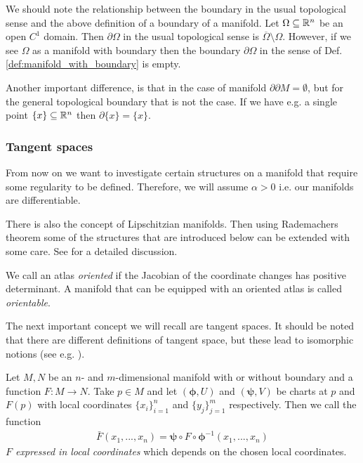 \documentclass[../main.tex]{subfiles}
\begin{document}
\begin{remark}
    We should note the relationship between the boundary in the usual topological sense 
    and the above definition of a boundary of a manifold. Let $\Omega \subseteq \mathbb{R}^n$ be 
    an open $C^1$ domain. Then $\partial \Omega$ in the usual topological sense 
    is $\overline{\Omega} \setminus \Omega$. However, if we see $\Omega$ 
    as a manifold with boundary then the boundary $\partial \Omega$ in the sense of 
    Def. \ref{def:manifold_with_boundary} is empty. 

    Another important difference, is that in the case of manifold $\partial \partial M = \emptyset$,
    but for the general topological boundary that is not the case. If we have e.g. a single 
    point $\{ x \} \subseteq \mathbb{R}^n$ then $\partial \{x \} = \{ x \}$.   
\end{remark}

\subsubsection{Tangent spaces}\label{sec:tangent_spaces}

From now on we want to investigate certain structures on a manifold 
that require some regularity to be defined. Therefore, 
we will assume $\alpha > 0$ i.e. our manifolds are 
differentiable.

\begin{remark}
    There is also the concept of Lipschitzian manifolds. Then using Rademachers 
    theorem some of the structures that are introduced below can be extended 
    with some care. See \cite{lipschitz_manifolds} for a detailed discussion.
\end{remark}

\begin{definition}
    We call an atlas \textit{oriented} if the Jacobian of the coordinate
    changes has positive determinant. A manifold that can be equipped with 
    an oriented atlas is called \textit{orientable}.
\end{definition}


The next important concept we will recall are tangent spaces. 
It should be noted that there are different definitions of tangent space, but
these lead to isomorphic notions 
(see e.g. \cite[Sec.\,1.B]{riemannian_geometry}).

\begin{definition}
    Let $M, N$ be an $n$- and $m$-dimensional manifold with or without boundary 
    and a function $F: M \rightarrow N$. Take $p \in M$ and let $(\boldsymbol{\phi}, U)$ 
    and $(\boldsymbol{\psi},V)$ be charts at $p$ and $F(p)$ with local 
    coordinates $\{x_i\}_{i=1}^n$ and $\{y_j\}_{j=1}^m$ respectively. 
    Then we call the function 
    \begin{align*}
        \bar{F} (x_1,...,x_n) = \boldsymbol{\psi} \circ F \circ \boldsymbol{\phi}^{-1}(x_1,...,x_n)        
    \end{align*}
    \textit{$F$ expressed in local coordinates} which depends
    on the chosen local coordinates.
\end{definition}
\end{document}
